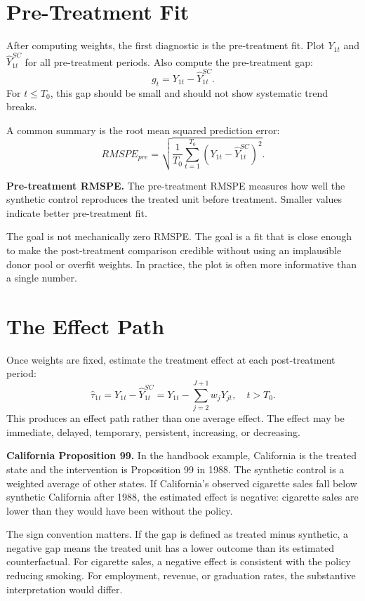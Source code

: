 \section{Pre-Treatment Fit}

After computing weights, the first diagnostic is the pre-treatment fit. Plot \(Y_{1t}\) and \(\widehat{Y}^{SC}_{1t}\) for all pre-treatment periods. Also compute the pre-treatment gap:
\[
g_t=Y_{1t}-\widehat{Y}^{SC}_{1t}.
\]
For \(t\leq T_0\), this gap should be small and should not show systematic trend breaks.

A common summary is the root mean squared prediction error:
\[
RMSPE_{pre}
=
\sqrt{
\frac{1}{T_0}
\sum_{t=1}^{T_0}
\left(Y_{1t}-\widehat{Y}^{SC}_{1t}\right)^2
}.
\]

\begin{defN}
\textbf{Pre-treatment RMSPE.} The pre-treatment RMSPE measures how well the synthetic control reproduces the treated unit before treatment. Smaller values indicate better pre-treatment fit.
\end{defN}

The goal is not mechanically zero RMSPE. The goal is a fit that is close enough to make the post-treatment comparison credible without using an implausible donor pool or overfit weights. In practice, the plot is often more informative than a single number.

\section{The Effect Path}

Once weights are fixed, estimate the treatment effect at each post-treatment period:
\[
\widehat{\tau}_{1t}
=
Y_{1t}-\widehat{Y}^{SC}_{1t}
=
Y_{1t}-\sum_{j=2}^{J+1}w_jY_{jt},
\quad t>T_0.
\]
This produces an effect path rather than one average effect. The effect may be immediate, delayed, temporary, persistent, increasing, or decreasing.

\begin{exmp}
\textbf{California Proposition 99.} In the handbook example, California is the treated state and the intervention is Proposition 99 in 1988. The synthetic control is a weighted average of other states. If California's observed cigarette sales fall below synthetic California after 1988, the estimated effect is negative: cigarette sales are lower than they would have been without the policy.
\end{exmp}

The sign convention matters. If the gap is defined as treated minus synthetic, a negative gap means the treated unit has a lower outcome than its estimated counterfactual. For cigarette sales, a negative effect is consistent with the policy reducing smoking. For employment, revenue, or graduation rates, the substantive interpretation would differ.

